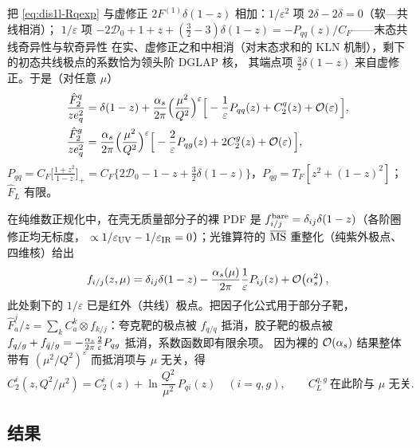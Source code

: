 把 \cref{eq:dis1l-Rqexp} 与虚修正 $2F^{(1)}\delta(1-z)$ 相加：$1/\varepsilon^2$ 项 $2\delta-2\delta=0$（软—共线相消）；
$1/\varepsilon$ 项 $-2\mathcal D_0+1+z+(\frac32-3)\delta(1-z)=-P_{qq}(z)/C_F$——末态共线奇异性与软奇异性
在实、虚修正之和中相消（对末态求和的 KLN 机制），剩下的初态共线极点的系数恰为领头阶 DGLAP 核，
其端点项 $\frac32\delta(1-z)$ 来自虚修正。于是（对任意 $\mu$）
\begin{align}
\frac{\hat F_2^q}{ze_q^2}&=\delta(1-z)+\frac{\alpha_s}{2\pi}\Big(\frac{\mu^2}{Q^2}\Big)^{\varepsilon}\Big[-\frac{1}{\varepsilon}P_{qq}(z)+C_2^q(z)+\mathcal{O}\!\left(\varepsilon\right)\Big],
\label{eq:dis1l-Fq}\\
\frac{\hat F_2^g}{ze_q^2}&=\frac{\alpha_s}{2\pi}\Big(\frac{\mu^2}{Q^2}\Big)^{\varepsilon}\Big[-\frac{2}{\varepsilon}P_{qg}(z)+2C_2^g(z)+\mathcal{O}\!\left(\varepsilon\right)\Big],
\label{eq:dis1l-Fg}
\end{align}
$P_{qq}=C_F\big[\frac{1+z^2}{1-z}\big]_+=C_F\big\{2\mathcal D_0-1-z+\frac32\delta(1-z)\big\}$，$P_{qg}=T_F[z^2+(1-z)^2]$；$\hat F_L$ 有限。

在纯维数正规化中，在壳无质量部分子的裸 PDF 是 $f^{\rm bare}_{i/j}=\delta_{ij}\delta(1-z)$（各阶圈修正均无标度，
$\propto1/\varepsilon_{\rm UV}-1/\varepsilon_{\rm IR}=0$）；光锥算符的 $\overline{\mathrm{MS}}$ 重整化（纯紫外极点、四维核）给出
\begin{equation}\label{eq:dis1l-partonpdf}
f_{i/j}(z,\mu)=\delta_{ij}\delta(1-z)-\frac{\alpha_s(\mu)}{2\pi}\frac{1}{\varepsilon}P_{ij}(z)+\mathcal{O}\!\left(\alpha_s^2\right),
\end{equation}
此处剩下的 $1/\varepsilon$ 已是红外（共线）极点。把因子化公式用于部分子靶，
$\hat F_a^j/z=\sum_kC_a^k\otimes f_{k/j}$：夸克靶的极点被 $f_{q/q}$ 抵消，胶子靶的极点被
$f_{q/g}+f_{\bar q/g}=-\frac{\alpha_s}{2\pi}\frac{2}{\varepsilon}P_{qg}$ 抵消，系数函数即有限余项。
因为裸的 $\mathcal{O}\!\left(\alpha_s\right)$ 结果整体带有 $(\mu^2/Q^2)^\varepsilon$ 而抵消项与 $\mu$ 无关，得
\begin{equation}\label{eq:dis1l-mu}
C_2^i(z,Q^2/\mu^2)=C_2^i(z)+\ln\frac{Q^2}{\mu^2}\,P_{qi}(z)\quad(i=q,g),\qquad C_L^{q,g}\ \text{在此阶与 }\mu\text{ 无关}.
\end{equation}

\subsection{结果}

